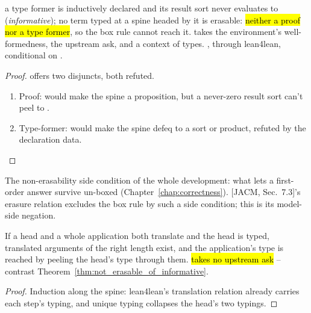 \begin{theorem}
\label{thm:not_erasable_of_informative}
\leanok
{} a type former is inductively declared and its result sort never evaluates to
 (\emph{informative});
 no term typed at a spine headed by it is erasable: \hl{neither a proof nor a type
former}, so the box rule cannot reach it.
 takes the environment's well-formedness, the upstream ask, and a context of types.
 \stProved{}, \stInherited{} through lean4lean, conditional on \stAssumed{}
.
\end{theorem}
\begin{proof}
\leanok
{}
 \Erasable{} offers two disjuncts, both refuted.
\begin{enumerate}
\item Proof: would make the spine a proposition, but a never-zero result sort can't peel to
.
\item Type-former: would make the spine defeq to a sort or product, refuted by the declaration
data.
\end{enumerate}
\end{proof}

\begin{remark}
 The non-erasability side condition of the whole development: what lets a first-order
answer survive un-boxed (Chapter~\ref{chap:correctness}). [JACM, Sec.~7.3]'s erasure relation
excludes the box rule by such a side condition; this is its model-side negation.
\end{remark}

\begin{lemma}
\label{lem:trExprS_spine_peel}
\leanok
{} If a head and a whole application both translate and the head is typed, translated
arguments of the right length exist, and the application's type is reached by peeling the head's
type through them.
 \hl{takes no upstream ask} -- contrast Theorem~\ref{thm:not_erasable_of_informative}.
\end{lemma}
\begin{proof}
\leanok
{}
 Induction along the spine: lean4lean's translation relation already carries each
step's typing, and unique typing collapses the head's two typings.
\end{proof}


